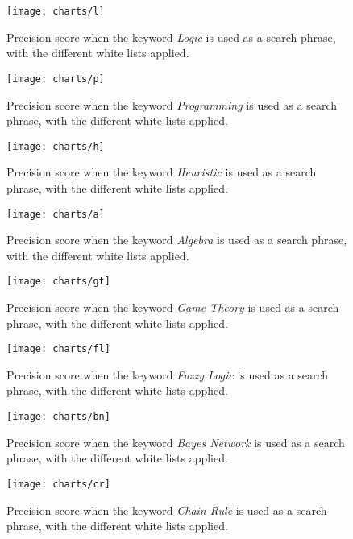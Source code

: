 


\begin{figure}[h] 
\caption{Precision score when the keyword \textit{Logic} is used as a search phrase, with the different white lists applied.}
\texttt{[image: charts/l]}
\label{fig:l}
\end{figure}

\begin{figure}[h] 
\caption{Precision score when the keyword \textit{Programming} is used as a search phrase, with the different white lists applied.}
\texttt{[image: charts/p]}
\label{fig:p}
\end{figure}

\begin{figure}[h] 
\caption{Precision score when the keyword \textit{Heuristic} is used as a search phrase, with the different white lists applied.}
\texttt{[image: charts/h]}
\label{fig:h}
\end{figure}

\begin{figure}[h] 
\caption{Precision score when the keyword \textit{Algebra} is used as a search phrase, with the different white lists applied.}
\texttt{[image: charts/a]}
\label{fig:a}
\end{figure}

\begin{figure}[h] 
\caption{Precision score when the keyword \textit{Game Theory} is used as a search phrase, with the different white lists applied.}
\texttt{[image: charts/gt]}
\label{fig:gt}
\end{figure}

\begin{figure}[h] 
\caption{Precision score when the keyword \textit{Fuzzy Logic} is used as a search phrase, with the different white lists applied.}
\texttt{[image: charts/fl]}
\label{fig:fl}
\end{figure}



\begin{figure}[h] 
\caption{Precision score when the keyword \textit{Bayes Network} is used as a search phrase, with the different white lists applied.}
\texttt{[image: charts/bn]}
\label{fig:bn}
\end{figure}



\begin{figure}[h] 
\caption{Precision score when the keyword \textit{Chain Rule} is used as a search phrase, with the different white lists applied.}
\texttt{[image: charts/cr]}
\label{fig:cr}
\end{figure}

